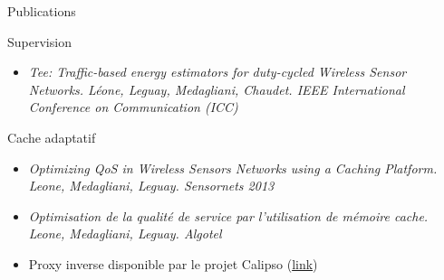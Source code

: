 \begin{frame}{Publications}
  \begin{block}{Supervision}
    \begin{itemize}
      \item \textit{Tee: Traffic-based energy estimators for duty-cycled Wireless Sensor Networks. Léone, Leguay, Medagliani, Chaudet. IEEE International Conference on Communication (ICC)}
    \end{itemize}
  \end{block}
  \begin{block}{Cache adaptatif}
    \begin{itemize}
      \item \textit{Optimizing QoS in Wireless Sensors Networks using a Caching Platform. Leone, Medagliani, Leguay. Sensornets 2013}
      \item \textit{Optimisation de la qualité de service par l'utilisation de mémoire cache. Leone, Medagliani, Leguay.
      Algotel}
      \item Proxy inverse disponible par le projet Calipso (\href{https://github.com/sics-iot/calipso}{link})
    \end{itemize}
  \end{block}
\end{frame}

